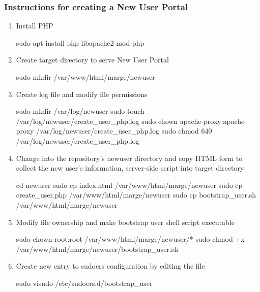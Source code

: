

\subsubsection*{Instructions for creating a New User Portal}

\begin{enumerate}
    \item Install PHP 
    \begin{terminal}
        sudo apt install php libapache2-mod-php
    \end{terminal}
    \item Create target directory to serve New User Portal
    \begin{terminal}
        sudo mkdir /var/www/html/marge/newuser
    \end{terminal}
    \item Create log file and modify file permissions
    \begin{terminal}
        sudo mkdir /var/log/newuser
        sudo touch /var/log/newuser/create_user_php.log
        sudo chown apache-proxy:apache-proxy /var/log/newuser/create_user_php.log
        sudo chmod 640 /var/log/newuser/create_user_php.log
    \end{terminal}
    \item Change into the repository's newuser directory and copy HTML form to
    collect the new user's information, server-side script into target directory
    \begin{terminal}
        cd newuser
        sudo cp index.html /var/www/html/marge/newuser
        sudo cp create_user.php /var/www/html/marge/newuser
        sudo cp bootstrap_user.sh /var/www/html/marge/newuser
    \end{terminal}
    \item Modify file ownership and make bootstrap user shell script executable
    \begin{terminal}
        sudo chown root:root /var/www/html/marge/newuser/*
        sudo chmod +x /var/www/html/marge/newuser/bootstrap_user.sh
    \end{terminal}
    \item Create new entry to sudoers configuration by editing the file
    \begin{terminal}
        sudo visudo /etc/sudoers.d/bootstrap_user

\end{terminal}
\end{enumerate}
